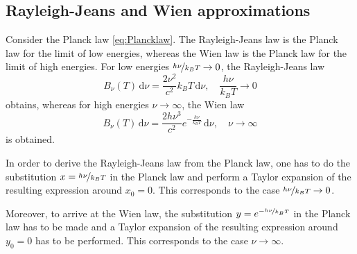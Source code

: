 \documentclass[a4paper,12pt]{report}
\begin{document}
\subsection{Rayleigh-Jeans and Wien approximations}
Consider the Planck law \cref{eq:Plancklaw}. The Rayleigh-Jeans law is the Planck law for the limit of low energies, whereas the Wien law is the Planck law for the limit of high energies. For low energies $\nicefrac{h\nu}{k_BT} \rightarrow 0$, the Rayleigh-Jeans law \begin{equation}\label{eq:RayleighJeanslaw}
B_\nu(T)\,\mathrm{d}\nu = \frac{2\nu^2}{c^2}k_BT\,\mathrm{d}\nu, \quad \frac{h\nu}{k_B T} \rightarrow 0
\end{equation} obtains, whereas for high energies $\nu \rightarrow \infty$, the Wien law \begin{equation}\label{eq:Wienlaw}
    B_\nu(T)\,\mathrm{d}\nu = \frac{2h\nu^3}{c^2}e^{-\frac{h\nu}{k_BT}}\,\mathrm{d}\nu, \quad \nu \rightarrow \infty
\end{equation} is obtained. 

In order to derive the Rayleigh-Jeans law from the Planck law, one has to do the substitution $x = \nicefrac{h\nu}{k_BT}$ in the Planck law and perform a Taylor expansion of the resulting expression around $x_0 = 0$. This corresponds to the case $\nicefrac{h\nu}{k_BT} \rightarrow 0$. 

Moreover, to arrive at the Wien law, the substitution $y = e^{-\nicefrac{h\nu}{k_BT}}$ in the Planck law has to be made and a Taylor expansion of the resulting expression around $y_0 =0$ has to be performed. This corresponds to the case $\nu \rightarrow \infty$.
\end{document}
